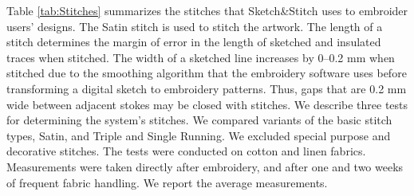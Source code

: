 \documentclass[header.tex]{subfiles}
\begin{document}
Table \ref{tab:Stitches} summarizes the stitches that Sketch\&Stitch uses to embroider users' designs. The Satin stitch is used to stitch the artwork. The length of a stitch determines the margin of error in the length of sketched and insulated traces when stitched. 
The width of a sketched line increases by 0--0.2 mm when stitched due to the smoothing algorithm that the embroidery software uses before transforming a digital sketch to embroidery patterns. Thus, gaps that are 0.2 mm wide between adjacent stokes may be closed with stitches. We describe three tests for determining the system's stitches. We compared variants of the basic stitch types, Satin, and Triple and Single Running. We excluded special purpose and decorative stitches. %
The tests were conducted on cotton and linen fabrics. Measurements were taken directly after embroidery, and after one and two weeks of frequent fabric handling. We report the average measurements.



  

\begin{table}[]
\centering
{}
\caption{Technical stitches for embroidering fabric traces and sensors.}
\label{tab:Stitches}
\vspace{-1.2em}
\end{table} 
\end{document}
